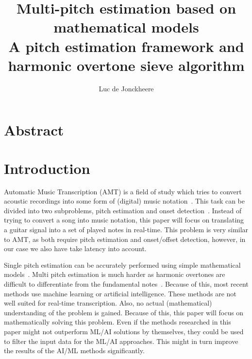 \documentclass[10pt,twocolumn]{article}
\title{\textbf{Multi-pitch estimation based on mathematical models}\\A pitch estimation framework and harmonic overtone sieve algorithm}
\author{Luc de Jonckheere}
\begin{document}

\maketitle


\section*{Abstract}



\section{Introduction}
Automatic Music Transcription (AMT) is a field of study which tries to convert acoustic recordings into some form of (digital) music notation~\cite{survey1}. This task can be divided into two subproblems, pitch estimation and onset detection~\cite{survey2}. Instead of trying to convert a song into music notation, this paper will focus on translating a guitar signal into a set of played notes in real-time. This problem is very similar to AMT, as both require pitch estimation and onset/offset detection, however, in our case we also have take latency into account.

Single pitch estimation can be accurately performed using simple mathematical models~\cite{mono}. Multi pitch estimation is much harder as harmonic overtones are difficult to differentiate from the fundamental notes~\cite{oud}. Because of this, most recent methods use machine learning or artificial intelligence. These methods are not well suited for real-time transcription. Also, no actual (mathematical) understanding of the problem is gained. Because of this, this paper will focus on mathematically solving this problem. Even if the methods researched in this paper might not outperform ML/AI solutions by themselves, they could be used to filter the input data for the ML/AI approaches. This might in turn improve the results of the AI/ML methods significantly.
\end{document}

